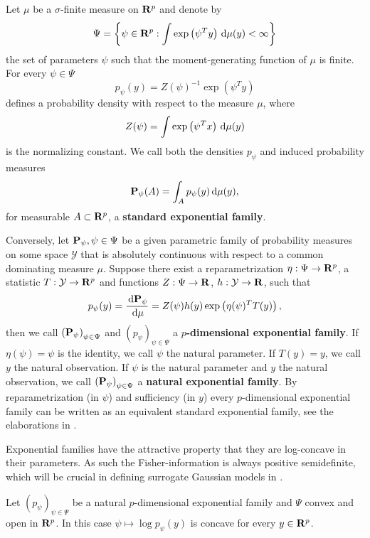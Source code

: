 \begin{definition}
    Let $\mu$ be a $\sigma$-finite measure on $\R^{p}$ and denote by 
    $$\Psi = \left\{\psi \in \R^{p} : \int \exp \left( \psi^{T} y \right) \d\mu(y) < \infty\right\}$$
    the set of parameters $\psi$ such that the moment-generating function of $\mu$ is finite. 
    For every $\psi \in \Psi$ $$p_{\psi}(y) = Z(\psi)^{-1} \exp (\psi^{T} y)$$ defines a probability density with respect to the measure $\mu$, where $$Z(\psi) = \int \exp \left( \psi^{T} x \right) \d\mu(y)$$ is the normalizing constant. 
    We call both the densities $p_{\psi}$ and induced probability measures $$ \P_{\psi} (A) = \int_{A} p_{\psi}(y) \d \mu(y),$$ for measurable $A \subset \R^{p}$, a \textbf{standard exponential family}.

    Conversely, let $\P_{\psi}, \psi \in \Psi$ be a given parametric family of probability measures on some space $\mathcal Y$ that is absolutely continuous with respect to a common dominating measure $\mu$. Suppose there exist a reparametrization $\eta : \Psi \to \R^{p}$, a statistic $T: \mathcal Y \to \R^{p}$ and functions $Z: \Psi\to \R$, $h:\mathcal Y \to \R$, such that
    $$
        p_{\psi}(y) = \frac{\d \P_{\psi}}{\d \mu} = Z(\psi) h(y) \exp \left(\eta(\psi)^{T}T(y)\right),
    $$
    then we call $\left(\P_{\psi}\right)_{\psi \in \Psi} $ and $\left(p_{\psi}\right)_{ \psi \in \Psi}$ a \textbf{$p$-dimensional exponential family}. If $\eta(\psi) = \psi$ is the identity, we call $\psi$ the natural parameter. If $T(y) = y$, we call $y$ the natural observation. If $\psi$ is the natural parameter and $y$ the natural observation, we call $\left( \P_{\psi} \right)_{\psi \in \Psi}$ a \textbf{natural exponential family}. By reparametrization (in $\psi$) and sufficiency (in $y$) every $p$-dimensional exponential family can be written as an equivalent standard exponential family, see the elaborations in \citep[Chapter 1]{Brown1986Fundamentals}.
\end{definition}

Exponential families have the attractive property that they are log-concave in their parameters. As such the Fisher-information is always positive semidefinite, which will be crucial in defining surrogate Gaussian models in .
\begin{lemma}
    \label{lem:log-concavity}
    Let $\left(p_{\psi}\right)_{\psi \in \Psi}$ be a natural $p$-dimensional exponential family and $\Psi$ convex and open in $\R^{p}$. In this case $\psi \mapsto \log p_{\psi}(y)$ is concave for every $y \in \R^{p}$.
\end{lemma}

